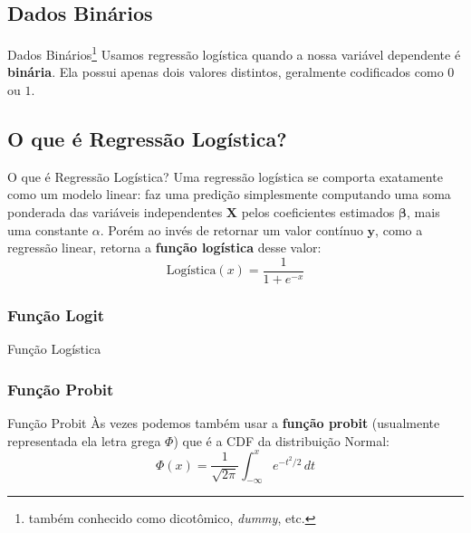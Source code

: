 \subsection{Dados Binários}
\begin{frame}{Dados Binários\footnote{também conhecido como dicotômico, \textit{dummy}, etc.}}
	Usamos regressão logística quando a nossa variável dependente é \textbf{binária}.
	Ela possui apenas dois valores distintos,
	geralmente codificados como $0$ ou $1$.
\end{frame}

\subsection{O que é Regressão Logística?}
\begin{frame}{O que é Regressão Logística?}
	Uma regressão logística se comporta exatamente como um modelo linear:
	faz uma predição simplesmente computando uma soma ponderada das variáveis
	independentes $\mathbf{X}$ pelos coeficientes estimados $\boldsymbol{\beta}$,
	mais uma constante $\alpha$. Porém ao invés de retornar um valor contínuo
	$\boldsymbol{y}$, como a regressão linear, retorna a \textbf{função logística}
	desse valor:
	$$
		\text{Logística}(x) = \frac{1}{1 + e^{-x}}
	$$
\end{frame}


\subsubsection{Função Logit}

\begin{frame}{Função Logística}
\end{frame}

\subsubsection{Função Probit}
\begin{frame}{Função Probit}
	Às vezes podemos também usar a \textbf{função probit} (usualmente representada
	ela letra grega $\Phi$) que é a CDF da distribuição Normal:
	$$
		\Phi (x)= \frac {1}{\sqrt {2 \pi}}\int _{-\infty }^{x}e^{-t^{2}/2}\,dt
	$$
\end{frame}

